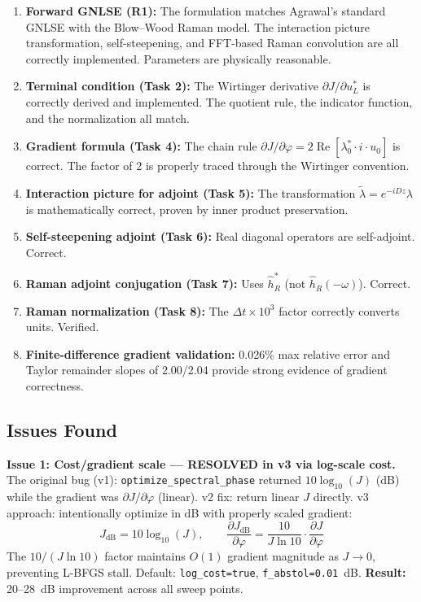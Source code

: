 \documentclass[12pt,a4paper]{article}
\newcommand{\pdv}[2]{\frac{\partial #1}{\partial #2}}
\newcommand{\Real}{\operatorname{Re}}
\theoremstyle{definition}
\begin{document}
\begin{enumerate}[leftmargin=*]
\item \textbf{Forward GNLSE (R1):} The formulation matches Agrawal's standard GNLSE with the Blow--Wood Raman model. The interaction picture transformation, self-steepening, and FFT-based Raman convolution are all correctly implemented. Parameters are physically reasonable.

\item \textbf{Terminal condition (Task 2):} The Wirtinger derivative $\partial J/\partial u_L^*$ is correctly derived and implemented. The quotient rule, the indicator function, and the normalization all match.

\item \textbf{Gradient formula (Task 4):} The chain rule $\partial J/\partial\varphi = 2\Real[\lambda_0^* \cdot i \cdot u_0]$ is correct. The factor of 2 is properly traced through the Wirtinger convention.

\item \textbf{Interaction picture for adjoint (Task 5):} The transformation $\tilde{\lambda} = e^{-iDz}\lambda$ is mathematically correct, proven by inner product preservation.

\item \textbf{Self-steepening adjoint (Task 6):} Real diagonal operators are self-adjoint. Correct.

\item \textbf{Raman adjoint conjugation (Task 7):} Uses $\hat{h}_R^*$ (not $\hat{h}_R(-\omega)$). Correct.

\item \textbf{Raman normalization (Task 8):} The $\Delta t \times 10^3$ factor correctly converts units. Verified.

\item \textbf{Finite-difference gradient validation:} 0.026\% max relative error and Taylor remainder slopes of 2.00/2.04 provide strong evidence of gradient correctness.
\end{enumerate}

\subsection{Issues Found}

\begin{verified}
\textbf{Issue 1: Cost/gradient scale --- RESOLVED in v3 via log-scale cost.} The original bug (v1): \texttt{optimize\_spectral\_phase} returned $10\log_{10}(J)$ (dB) while the gradient was $\partial J/\partial\varphi$ (linear). v2 fix: return linear $J$ directly. v3 approach: intentionally optimize in dB with properly scaled gradient:
\begin{equation}
J_{\text{dB}} = 10\log_{10}(J), \qquad \pdv{J_{\text{dB}}}{\varphi} = \frac{10}{J\ln 10}\cdot\pdv{J}{\varphi}
\end{equation}
The $10/(J\ln 10)$ factor maintains $O(1)$ gradient magnitude as $J \to 0$, preventing L-BFGS stall. Default: \texttt{log\_cost=true}, \texttt{f\_abstol=0.01}~dB. \textbf{Result:} 20--28~dB improvement across all sweep points.
\end{verified}
\end{document}
